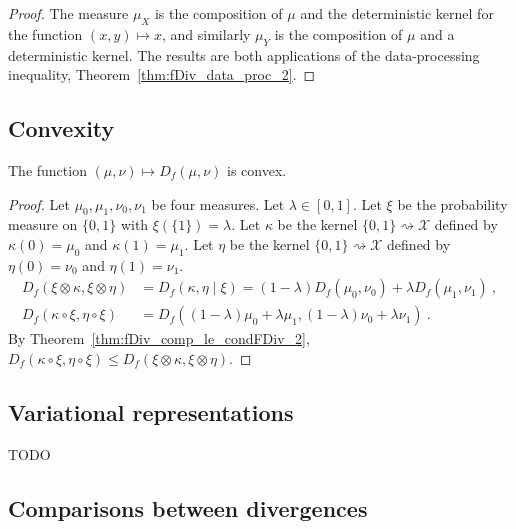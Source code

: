 \begin{proof}\leanok
{}
The measure $\mu_X$ is the composition of $\mu$ and the deterministic kernel for the function $(x,y) \mapsto x$, and similarly $\mu_Y$ is the composition of $\mu$ and a deterministic kernel.
The results are both applications of the data-processing inequality, Theorem~\ref{thm:fDiv_data_proc_2}.
\end{proof}




\subsection{Convexity}

\begin{theorem}
  \label{thm:fDiv_convex}
  The function $(\mu, \nu) \mapsto D_f(\mu, \nu)$ is convex.
\end{theorem}

\begin{proof}
Let $\mu_0, \mu_1, \nu_0, \nu_1$ be four measures. Let $\lambda \in [0,1]$. Let $\xi$ be the probability measure on $\{0,1\}$ with $\xi(\{1\}) = \lambda$.
Let $\kappa$ be the kernel $\{0,1\} \rightsquigarrow \mathcal X$ defined by $\kappa(0) = \mu_0$ and $\kappa(1) = \mu_1$.
Let $\eta$ be the kernel $\{0,1\} \rightsquigarrow \mathcal X$ defined by $\eta(0) = \nu_0$ and $\eta(1) = \nu_1$.
\begin{align*}
D_f(\xi \otimes \kappa, \xi \otimes \eta)
&= D_f(\kappa, \eta \mid \xi)
= (1 - \lambda) D_f(\mu_0, \nu_0) + \lambda D_f(\mu_1, \nu_1)
\: , \\
D_f(\kappa \circ \xi, \eta \circ \xi)
&= D_f((1 - \lambda)\mu_0 + \lambda \mu_1, (1 - \lambda)\nu_0 + \lambda \nu_1)
\: .
\end{align*}
By Theorem~\ref{thm:fDiv_comp_le_condFDiv_2}, $D_f(\kappa \circ \xi, \eta \circ \xi) \le D_f(\xi \otimes \kappa, \xi \otimes \eta)$.
\end{proof}



\subsection{Variational representations}

TODO




\subsection{Comparisons between divergences}

